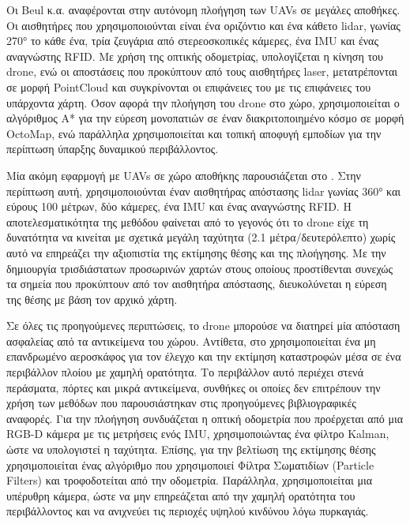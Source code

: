 Οι Beul κ.α. \cite{Beul2017} αναφέρονται στην αυτόνομη πλοήγηση των UAVs σε μεγάλες αποθήκες. Οι αισθητήρες που χρησιμοποιούνται είναι ένα οριζόντιο και ένα κάθετο lidar, γωνίας 270° το κάθε ένα, τρία ζευγάρια από στερεοσκοπικές κάμερες, ένα IMU και ένας αναγνώστης RFID. Με χρήση της οπτικής οδομετρίας, υπολογίζεται η κίνηση του drone, ενώ οι αποστάσεις που προκύπτουν από τους αισθητήρες laser, μετατρέπονται σε μορφή PointCloud και συγκρίνονται οι επιφάνειες του με τις επιφάνειες του υπάρχοντα χάρτη. Όσον αφορά την πλοήγηση του drone στο χώρο, χρησιμοποιείται ο αλγόριθμος A* για την εύρεση μονοπατιών σε έναν διακριτοποιημένο κόσμο σε μορφή OctoMap, ενώ παράλληλα χρησιμοποιείται και τοπική αποφυγή εμποδίων για την περίπτωση ύπαρξης δυναμικού περιβάλλοντος.

Μία ακόμη εφαρμογή με UAVs σε χώρο αποθήκης παρουσιάζεται στο \cite{8392775}. Στην περίπτωση αυτή, χρησιμοποιούνται έναν αισθητήρας απόστασης lidar γωνίας 360° και εύρους 100 μέτρων, δύο κάμερες, ένα IMU και ένας αναγνώστης RFID. Η αποτελεσματικότητα της μεθόδου φαίνεται από το γεγονός ότι το drone είχε τη δυνατότητα να κινείται με σχετικά μεγάλη ταχύτητα (2.1 μέτρα/δευτερόλεπτο) χωρίς αυτό να επηρεάζει την αξιοπιστία της εκτίμησης θέσης και της πλοήγησης. Με την δημιουργία τρισδιάστατων προσωρινών χαρτών στους οποίους προστίθενται συνεχώς τα σημεία που προκύπτουν από τον αισθητήρα απόστασης, διευκολύνεται η εύρεση της θέσης με βάση τον αρχικό χάρτη.

Σε όλες τις προηγούμενες περιπτώσεις, το drone μπορούσε να διατηρεί μία απόσταση ασφαλείας από τα αντικείμενα του χώρου. Αντίθετα, στο \cite{Fang-2017-5588} χρησιμοποιείται ένα μη επανδρωμένο αεροσκάφος για τον έλεγχο και την εκτίμηση καταστροφών μέσα σε ένα περιβάλλον πλοίου με χαμηλή ορατότητα. Το περιβάλλον αυτό περιέχει στενά περάσματα, πόρτες και μικρά αντικείμενα, συνθήκες οι οποίες δεν επιτρέπουν την χρήση των μεθόδων που παρουσιάστηκαν στις προηγούμενες βιβλιογραφικές αναφορές. Για την πλοήγηση συνδυάζεται η οπτική οδομετρία που προέρχεται από μια RGB-D κάμερα με τις μετρήσεις ενός IMU, χρησιμοποιώντας ένα φίλτρο Kalman, ώστε να υπολογιστεί η ταχύτητα. Επίσης, για την βελτίωση της εκτίμησης θέσης χρησιμοποιείται ένας αλγόριθμο που χρησιμοποιεί Φίλτρα Σωματιδίων (Particle Filters) και τροφοδοτείται από την οδομετρία. Παράλληλα, χρησιμοποιείται μια υπέρυθρη κάμερα, ώστε να μην επηρεάζεται από την χαμηλή ορατότητα του περιβάλλοντος και να ανιχνεύει τις περιοχές υψηλού κινδύνου λόγω πυρκαγιάς.
